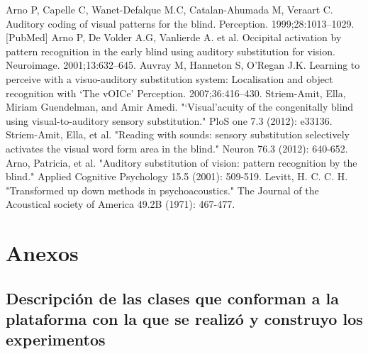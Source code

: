 \documentclass{article}
\numberwithin{figure}{section}
\begin{document}
\begin{thebibliography}{9}
Arno P, Capelle C, Wanet-Defalque M.C, Catalan-Ahumada M, Veraart C. Auditory coding of visual patterns for the blind. Perception. 1999;28:1013–1029. [PubMed]
Arno P, De Volder A.G, Vanlierde A. et al. Occipital activation by pattern recognition in the early blind using auditory substitution for vision. Neuroimage. 2001;13:632–645.
Auvray M, Hanneton S, O’Regan J.K. Learning to perceive with a visuo-auditory substitution system: Localisation and object recognition with ‘The vOICe’ Perception. 2007;36:416–430.
Striem-Amit, Ella, Miriam Guendelman, and Amir Amedi. "‘Visual’acuity of the congenitally blind using visual-to-auditory sensory substitution." PloS one 7.3 (2012): e33136.
Striem-Amit, Ella, et al. "Reading with sounds: sensory substitution selectively activates the visual word form area in the blind." Neuron 76.3 (2012): 640-652.
Arno, Patricia, et al. "Auditory substitution of vision: pattern recognition by the blind." Applied Cognitive Psychology 15.5 (2001): 509-519.
Levitt, H. C. C. H. "Transformed up down methods in psychoacoustics." The Journal of the Acoustical society of America 49.2B (1971): 467-477.
\end{thebibliography}


\clearpage

\section{Anexos}
\subsection{Descripción de las clases que conforman a la plataforma con la que se realizó y construyo los experimentos} \label{anexo:Clases}
\end{document}
